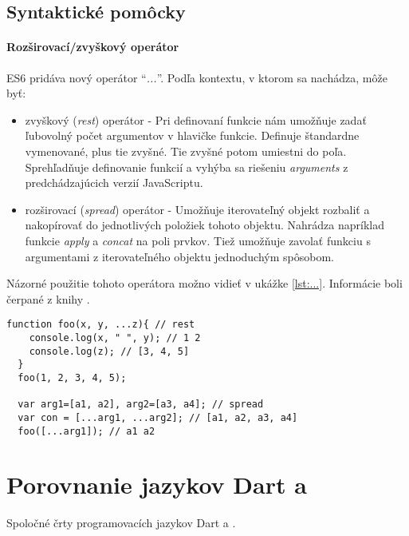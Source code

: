 \subsection{Syntaktické pomôcky}

\paragraph{Rozširovací/zvyškový operátor}
\label{par:spreadOp}
ES6 pridáva nový operátor ``\emph{...}''. Podľa kontextu, v ktorom sa nachádza, môže byť:
\begin{itemize}
  \item zvyškový (\emph{rest}) operátor - Pri definovaní funkcie nám umožňuje zadať ľubovolný počet argumentov v hlavičke funkcie. Definuje štandardne vymenované, plus tie zvyšné. Tie zvyšné potom umiestni do poľa. Sprehľadňuje definovanie funkcií a vyhýba sa riešeniu \emph{arguments} z predchádzajúcich verzií JavaScriptu.
  \item rozširovací (\emph{spread}) operátor - Umožňuje iterovateľný objekt rozbaliť a nakopírovať do jednotlivých položiek tohoto objektu. Nahrádza napríklad funkcie \emph{apply} a \emph{concat} na poli prvkov. Tiež umožňuje zavolať funkciu s argumentami z iterovateľného objektu jednoduchým spôsobom.
\end{itemize}
Názorné použitie tohoto operátora možno vidieť v ukážke \ref{lst:...}.
Informácie boli čerpané z knihy \cite[Exploring ES6]{expES6}.

\begin{lstlisting}[caption=rozširovací/zvyškový operátor, label={lst:...}]
  function foo(x, y, ...z){ // rest
    console.log(x, " ", y); // 1 2
    console.log(z); // [3, 4, 5]
  }
  foo(1, 2, 3, 4, 5);

  var arg1=[a1, a2], arg2=[a3, a4]; // spread
  var con = [...arg1, ...arg2]; // [a1, a2, a3, a4]
  foo([...arg1]); // a1 a2
\end{lstlisting}








\section{Porovnanie jazykov Dart a \JS{}}
Spoločné črty programovacích jazykov Dart a \JS{}. \TODO

